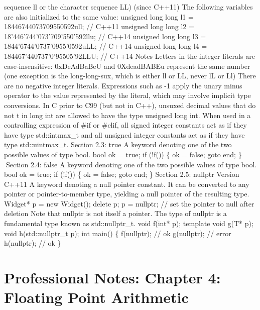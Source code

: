 sequence ll or the character sequence LL) (since C++11) The following
variables are also initialized to the same value: unsigned long long l1
= 18446744073709550592ull; // C++11 unsigned long long l2 =
18'446'744'073'709'550'592llu; // C++14 unsigned long long l3 =
1844'6744'0737'0955'0592uLL; // C++14 unsigned long long l4 =
184467'440737'0'95505'92LLU; // C++14 Notes Letters in the integer
literals are case-insensitive: 0xDeAdBaBeU and 0XdeadBABEu represent the
same number (one exception is the long-long-sux, which is either ll or
LL, never lL or Ll) There are no negative integer literals. Expressions
such as -1 apply the unary minus operator to the value represented by
the literal, which may involve implicit type conversions. In C prior to
C99 (but not in C++), unsuxed decimal values that do not t in long int
are allowed to have the type unsigned long int. When used in a
controlling expression of \#if or \#elif, all signed integer constants
act as if they have type std::intmax\_t and all unsigned integer
constants act as if they have type std::uintmax\_t. Section 2.3: true A
keyword denoting one of the two possible values of type bool. bool ok =
true; if (!f()) \{ ok = false; goto end; \} Section 2.4: false A
keyword denoting one of the two possible values of type bool. bool ok =
true; if (!f()) \{ ok = false; goto end; \} Section 2.5: nullptr Version
C++11 A keyword denoting a null pointer constant. It can be converted to
any pointer or pointer-to-member type, yielding a null pointer of the
resulting type. Widget* p = new Widget(); delete p; p = nullptr; // set
the pointer to null after deletion Note that nullptr is not itself a
pointer. The type of nullptr is a fundamental type known as
std::nullptr\_t. void f(int* p); template void g(T* p); void
h(std::nullptr\_t p); int main() \{ f(nullptr); // ok g(nullptr); //
error h(nullptr); // ok \}

\hypertarget{professional-notes-chapter-4-floating-point-arithmetic}{%
\section{Professional Notes: Chapter 4: Floating Point
Arithmetic}\label{professional-notes-chapter-4-floating-point-arithmetic}}


